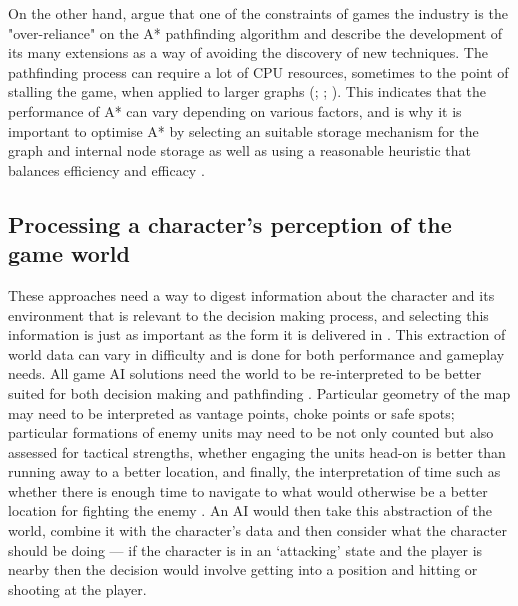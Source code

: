 \documentclass[11pt, a4paper]{report}
\begin{document}
On the other hand, \citeauthor{graham2003pathfinding} \parencite*[68]{graham2003pathfinding} argue that one of the constraints of games the industry is the "over-reliance" on the A* pathfinding algorithm and describe the development of its many extensions as a way of avoiding the discovery of new techniques. The pathfinding process can require a lot of CPU resources, sometimes to the point of stalling the game, when applied to larger graphs (\cite[127]{cui2011based}; \cite[110]{stentz1996map}; \cite[67]{graham2003pathfinding}). This indicates that the performance of A* can vary depending on various factors, and is why it is important to optimise A* by selecting an suitable storage mechanism for the graph and internal node storage as well as using a reasonable heuristic that balances efficiency and efficacy \parencite[228]{millington2019ai}.

\subsection{Processing a character's perception of the game world}
\label{subsec:processingACharactersPerception}

These approaches need a way to digest information about the character and its environment that is relevant to the decision making process, and selecting this information is just as important as the form it is delivered in \parencite[126]{cui2011based}. This extraction of world data can vary in difficulty \parencite[3]{diller2004behavior} and is done for both performance and gameplay needs. All game AI solutions need the world to be re-interpreted to be better suited for both decision making \parencite[2]{buro2004call} and pathfinding \parencite[3]{diller2004behavior}. Particular geometry of the map may need to be interpreted as vantage points, choke points or safe spots; particular formations of enemy units may need to be not only counted but also assessed for tactical strengths, whether engaging the units head-on is better than running away to a better location, and finally, the interpretation of time such as whether there is enough time to navigate to what would otherwise be a better location for fighting the enemy \parencite{buro2004call}. An AI would then take this abstraction of the world, combine it with the character's data and then consider what the character should be doing --- if the character is in an `attacking' state and the player is nearby then the decision would involve getting into a position and hitting or shooting at the player. 
\end{document}
